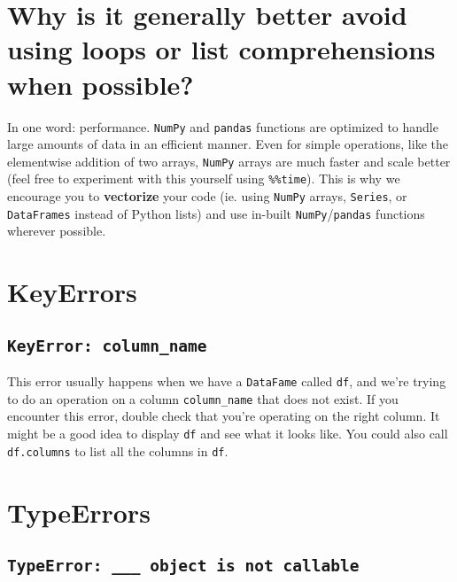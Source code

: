 \documentclass[
  letterpaper,
  DIV=11,
  numbers=noendperiod]{scrreprt}
\begin{document}
\section{Why is it generally better avoid using loops or list
comprehensions when
possible?}\label{why-is-it-generally-better-avoid-using-loops-or-list-comprehensions-when-possible}

In one word: performance. \texttt{NumPy} and \texttt{pandas} functions
are optimized to handle large amounts of data in an efficient manner.
Even for simple operations, like the elementwise addition of two arrays,
\texttt{NumPy} arrays are much faster and scale better (feel free to
experiment with this yourself using \texttt{\%\%time}). This is why we
encourage you to \textbf{vectorize} your code (ie. using \texttt{NumPy}
arrays, \texttt{Series}, or \texttt{DataFrames} instead of Python lists)
and use in-built \texttt{NumPy}/\texttt{pandas} functions wherever
possible.

\section{KeyErrors}\label{keyerrors}

\subsection{\texorpdfstring{\texttt{KeyError:\ \textquotesingle{}column\_name\textquotesingle{}}}{KeyError: \textquotesingle column\_name\textquotesingle{}}}\label{keyerror-column_name}

This error usually happens when we have a \texttt{DataFame} called
\texttt{df}, and we're trying to do an operation on a column
\texttt{\textquotesingle{}column\_name\textquotesingle{}} that does not
exist. If you encounter this error, double check that you're operating
on the right column. It might be a good idea to display \texttt{df} and
see what it looks like. You could also call \texttt{df.columns} to list
all the columns in \texttt{df}.

\section{TypeErrors}\label{typeerrors}

\subsection{\texorpdfstring{\texttt{TypeError:\ \textquotesingle{}\_\_\_\textquotesingle{}\ object\ is\ not\ callable}}{TypeError: \textquotesingle\_\_\_\textquotesingle{} object is not callable}}\label{typeerror-___-object-is-not-callable}
\end{document}
